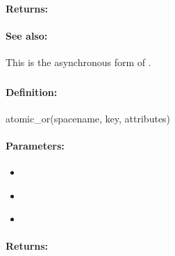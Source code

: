 \paragraph{Returns:}


\paragraph{See also:}  This is the asynchronous form of .

\pagebreak
\subsubsection{}
\label{api:ruby:atomic_or}


\paragraph{Definition:}
\begin{rubycode}
atomic_or(spacename, key, attributes)
\end{rubycode}

\paragraph{Parameters:}
\begin{itemize}[noitemsep]
\item {}\\

\item {}\\

\item {}\\

\end{itemize}

\paragraph{Returns:}


\pagebreak
\subsubsection{}
\label{api:ruby:async_atomic_or}


